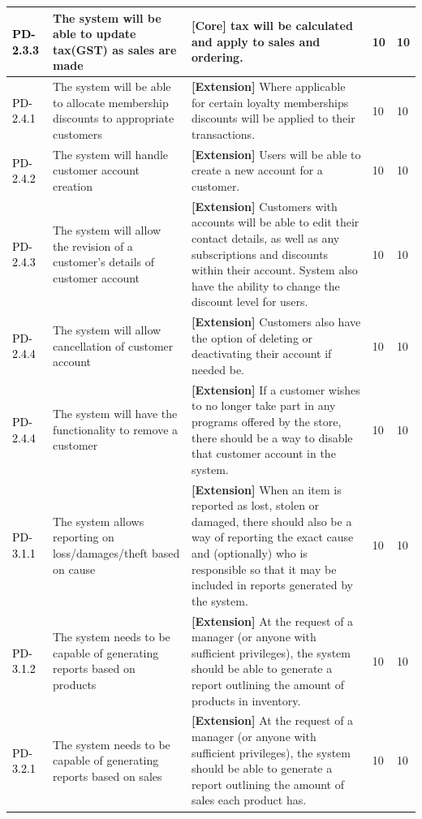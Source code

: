 \documentclass[a4paper]{article}
\begin{document}
\begin{longtable}{|l|p{5cm}|p{7cm}|p{0.5cm}|p{0.5cm}|}
\textcolor{black}{PD-2.3.3} & The system will be able to update tax(GST) as sales are made & \textbf{[Core] } tax will be calculated and apply to sales and ordering. & 10 & 10\\
\hline
\textcolor{black}{PD-2.4.1} & The system will be able to allocate membership discounts to appropriate customers & \textbf{[Extension] }Where applicable for certain loyalty memberships discounts will be applied to their transactions. & 10 & 10\\
\textcolor{black}{PD-2.4.2} & The system will handle customer account creation & \textbf{[Extension] }Users will be able to create a new account for a customer. & 10 & 10\\
\textcolor{black}{PD-2.4.3} & The system will allow the revision of a customer’s details of customer account& \textbf{[Extension] }Customers with accounts will be able to edit their contact details, as well as any subscriptions and discounts within their account. System also have the ability to change the discount level for users. & 10 & 10\\
\textcolor{black}{PD-2.4.4} & The system will allow cancellation of customer account& \textbf{[Extension] } Customers also have the option of deleting or deactivating their account if needed be. & 10 & 10\\
\textcolor{black}{PD-2.4.4} & The system will have the functionality to remove a customer & \textbf{[Extension] }If a customer wishes to no longer take part in any programs offered by the store, there should be a way to disable that customer account in the system.& 10 & 10\\
\hline
\textcolor{black}{PD-3.1.1} & The system allows reporting on loss/damages/theft based on cause & \textbf{[Extension] }When an item is reported as lost, stolen or damaged, there should also be a way of reporting the exact cause and (optionally) who is responsible so that it may be included in reports generated by the system.& 10 & 10\\
\textcolor{black}{PD-3.1.2} & The system needs to be capable of generating reports based on products & \textbf{[Extension] }At the request of a manager (or anyone with sufficient privileges), the system should be able to generate a report outlining the amount of products in inventory.& 10 & 10\\
\hline
\textcolor{black}{PD-3.2.1} & The system needs to be capable of generating reports based on sales & \textbf{[Extension] }At the request of a manager (or anyone with sufficient privileges), the system should be able to generate a report outlining the amount of sales each product has.& 10 & 10\\

\end{longtable}
\end{document}
